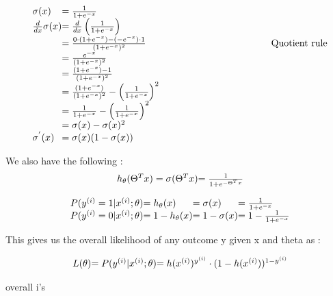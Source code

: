 \[
	\begin{array}{ l@{} l@{} }
\sigma(x)             & = \frac{1}{1+e^{-x}} \\
\frac{d}{dx}\sigma(x) & = \frac{d}{dx} \left(  \frac{1}{1+e^{-x} } \right) \\
                      & = \frac{0 \cdot(1+e^{-x}) - (-e^{-x}) \cdot 1}{ ( 1+e^{-x} ) ^2} \text{$\hspace{46 mm}$Quotient rule}\\
                      & = \frac{e^{-x}}{ ( 1+e^{-x} ) ^2}  \\
                      & = \frac{(1+e^{-x}) -1 }{ ( 1+e^{-x} ) ^2} \\
                      & = \frac{ (1+e^{-x})}{ ( 1+e^{-x} ) ^2}  - \left( \frac{1}{1+e^{-x}} \right)^2\\
                      & = \frac{1}{1+e^{-x}}  - \left( \frac{1}{1+e^{-x}} \right)^2\\
                      & = \sigma (x) - \sigma(x)^2\\
\sigma^{'} (x)        & = \sigma(x)(1-\sigma(x))
	\end{array}
\]


We also have the following :
\[
	\begin{array}{ l@{} l@{} } 
		h_\theta(\Theta^T x)
		= \sigma(\Theta^Tx)
		& = \frac{1}{1+e^{-\Theta^T x}} \\ 
	\end{array}
\]

\[
\begin{array}{ l@{} l@{} l@{} l@{} } 
		P(y^{(i)} = 1 | x^{(i)} ; \theta)
		& = h_\theta(x)
		& = \sigma(x)
		& = \frac{1}{1+e^{-x}}
		\\ 
		P(y^{(i)} = 0 | x^{(i)} ; \theta)
		& = 1 - h_\theta(x)
		& = 1 - \sigma(x)
		& = 1 - \frac{1}{1+e^{-x}}
		\\ 
	\end{array}
\]

This gives us the overall likelihood of any outcome y given x and theta as :

\[
\begin{array}{ l@{} l@{} l@{} } 
		L(\theta) 
		& = P(y^{(i)}| x^{(i)} ; \theta)
		& = h(x^{(i)})^{y^{(i)}} \cdot ( 1 - h(x^{(i)}))^{1 - y^{(i)}} 
	\end{array}
\]

overall i's

